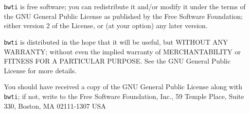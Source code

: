 \noindent
{\tt bwti} is free software; you can redistribute it and/or modify
it under the terms of the GNU General Public License as published by
the Free Software Foundation; either version 2 of the License, or
(at your option) any later version.

\noindent
{\tt bwti} is distributed in the hope that it will be useful,
but WITHOUT ANY WARRANTY; without even the implied warranty of
MERCHANTABILITY or FITNESS FOR A PARTICULAR PURPOSE.  See the
GNU General Public License for more details.

\noindent
You should have received a copy of the GNU General Public License
along with {\tt bwti}; if not, write to the Free Software
Foundation, Inc., 59 Temple Place, Suite 330, Boston, MA  02111-1307  USA



